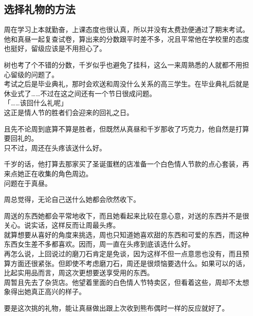 \subsection{选择礼物的方法}

周在学习上本就勤奋，上课态度也很认真，所以并没有太费劲便通过了期末考试。\\

他和真昼一起复查试卷，算出来的分数跟平时差不多，况且平常他在学校里的态度也挺好，留级应该是不用担心了。

树也考了个不错的分数，千岁似乎也避免了挂科，这么一来周熟悉的人就都不用担心留级的问题了。\\

考试之后是毕业典礼，那时会欢送和周没什么关系的高三学生。在毕业典礼后就是休业式了……不过在这之间还有一个节日很成问题。\\

「……该回什么礼呢」\\

这正是情人节的胜者们会迎来的回礼之日。

且先不论周到底算不算是胜者，但既然从真昼和千岁那收了巧克力，他自然是打算要回礼的。\\

只不过，周还在头疼该送什么好。

千岁的话，他打算去那家买了圣诞蛋糕的店准备一个白色情人节款的点心套装，再来点她正在收集的角色周边。\\

问题在于真昼。

周总觉得，无论自己送什么她都会欣然收下。

周送的东西她都会平常地收下，而且她看起来比较在意心意，对送的东西并不是很关心。说实话，这样反而让周最头疼。\\

就算想要从喜好的角度来挑选，周也只知道她喜欢甜的东西和可爱的东西，而这种东西女生差不多都喜欢。因而，周一直在头疼到底该选什么好。\\

再怎么说，上回说过的磨刀石肯定是免谈，因为这样不但一点意思也没有，而且预算方面还很紧张。但即使不考虑磨刀石，周还是很烦恼要选什么。如果可以的话，比起实用品而言，周这次更想要送享受用的东西。\\

周暂且先去了杂货店。他望着里面的白色情人节特卖区，但看着这些，周却不太想象得出她真正高兴的样子。

要是这次挑的礼物，能让真昼做出跟上次收到熊布偶时一样的反应就好了。\\

